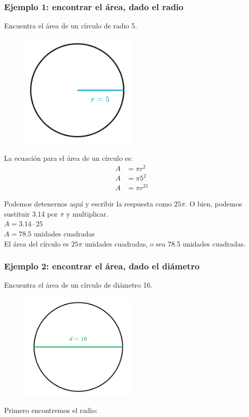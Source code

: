 \documentclass[11pt]{book}
\begin{document}
\subsubsection{Ejemplo 1: encontrar el área, dado el radio}
Encuentra el área de un círculo de radio 5.
\begin{figure}[H]
  \centering
  \includegraphics[width=0.5\textwidth]{./Unidad 2/Images/figS10_001.png}
\end{figure}
La ecuación para el área de un círculo es:
\begin{align*}
  A & = \pi r^2    \\
  A & = \pi 5^2    \\
  A & = \pi r^{25}
\end{align*}

Podemos detenernos aquí y escribir la respuesta como $25\pi$. O bien, podemos sustituir 3.14 por $\pi$ y multiplicar.\\
$A = 3.14 \cdot 25$\\
$A = 78.5$ unidades cuadradas\\
El área del círculo es $25\pi$ unidades cuadradas, o sea 78.5 unidades cuadradas.
\subsubsection{Ejemplo 2: encontrar el área, dado el diámetro}
Encuentra el área de un círculo de diámetro 16.
\begin{figure}[H]
  \centering
  \includegraphics[width=0.5\textwidth]{./Unidad 2/Images/figS10_002.png}
\end{figure}
Primero encontremos el radio:
\end{document}
